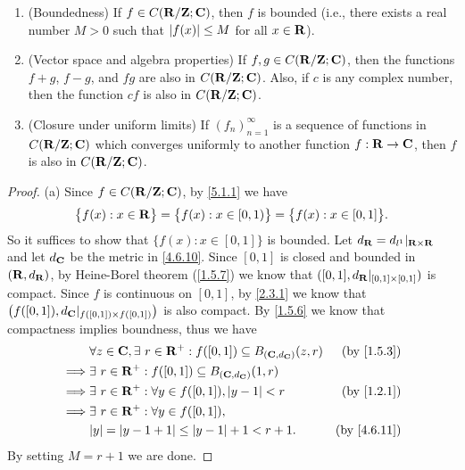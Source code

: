 \begin{lemma}\label{5.1.5}
  \quad
  \begin{enumerate}
    \item (Boundedness)
          If \(f \in C(\mathbf{R} / \mathbf{Z} ; \mathbf{C})\), then \(f\) is bounded
          (i.e., there exists a real number \(M > 0\) such that \(\left\lvert f(x)\right\rvert \leq M\) for all \(x \in \mathbf{R}\)).
    \item (Vector space and algebra properties)
          If \(f, g \in C(\mathbf{R} / \mathbf{Z} ; \mathbf{C})\), then the functions \(f + g\), \(f - g\), and \(f g\) are also in \(C(\mathbf{R} / \mathbf{Z} ; \mathbf{C})\).
          Also, if \(c\) is any complex number, then the function \(cf\) is also in \(C(\mathbf{R} / \mathbf{Z} ; \mathbf{C})\).
    \item (Closure under uniform limits)
          If \((f_n)_{n = 1}^\infty\) is a sequence of functions in \(C(\mathbf{R} / \mathbf{Z} ; \mathbf{C})\) which converges uniformly to another function \(f : \mathbf{R} \to \mathbf{C}\), then \(f\) is also in \(C(\mathbf{R} / \mathbf{Z} ; \mathbf{C})\).
  \end{enumerate}
\end{lemma}

\begin{proof}{(a)}
  Since \(f \in C(\mathbf{R} / \mathbf{Z} ; \mathbf{C})\), by \cref{5.1.1} we have
  \[
    \big\{f(x) : x \in \mathbf{R}\big\} = \big\{f(x) : x \in [0, 1)\big\} = \big\{f(x) : x \in [0, 1]\big\}.
  \]
  So it suffices to show that \(\{f(x) : x \in [0, 1]\}\) is bounded.
  Let \(d_{\mathbf{R}} = d_{l^1}|_{\mathbf{R} \times \mathbf{R}}\) and let \(d_{\mathbf{C}}\) be the metric in \cref{4.6.10}.
  Since \([0, 1]\) is closed and bounded in \((\mathbf{R}, d_{\mathbf{R}})\), by Heine-Borel theorem (\cref{1.5.7}) we know that \(([0, 1], d_{\mathbf{R}}|_{[0, 1] \times [0, 1]})\) is compact.
  Since \(f\) is continuous on \([0, 1]\), by \cref{2.3.1} we know that \(\big(f([0, 1]), d_{\mathbf{C}}|_{f([0, 1]) \times f([0, 1])}\big)\) is also compact.
  By \cref{1.5.6} we know that compactness implies boundness, thus we have
  \begin{align*}
             & \forall z \in \C, \exists\ r \in \R^+ : f([0, 1]) \subseteq B_{(\C, d_{\C})}(z, r) & \text{(by \cref{1.5.3})}  \\
    \implies & \exists\ r \in \R^+ : f([0, 1]) \subseteq B_{(\C, d_{\C})}(1, r)                                               \\
    \implies & \exists\ r \in \R^+ : \forall y \in f([0, 1]), \abs{y - 1} < r                     & \text{(by \cref{1.2.1})}  \\
    \implies & \exists\ r \in \R^+ : \forall y \in f([0, 1]),                                                                 \\
             & \abs{y} = \abs{y - 1 + 1} \leq \abs{y - 1} + 1 < r + 1.                            & \text{(by \cref{4.6.11})}
  \end{align*}
  By setting \(M = r + 1\) we are done.
\end{proof}

